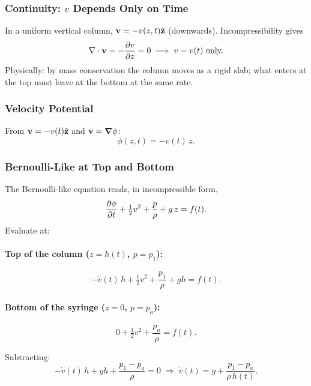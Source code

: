 \documentclass[../main.tex]{subfiles}
\begin{document}
\subsubsection{Continuity: $v$ Depends Only on Time}

In a uniform vertical column, $\mathbf{v} = -v(z,t)\hat{\mathbf{z}}$ (downwards). Incompressibility gives
\begin{equation}
  \nabla \cdot\mathbf{v} = -\pdv{v}{z} = 0 \;\Longrightarrow\; v=v(t)\text{ only.}
  \label{eq:lec15_v_t}
\end{equation}
Physically: by mass conservation the column moves as a rigid slab; what enters at the top must leave at the bottom at the same rate.

\subsubsection{Velocity Potential}

From $\mathbf{v} = -v(t)\hat{\mathbf{z}}$ and $\mathbf{v}=\grad\phi$:
\begin{equation}
  \phi(z,t) = -v(t)\,z.
  \label{eq:lec15_phi_syringe}
\end{equation}

\subsubsection{Bernoulli-Like at Top and Bottom}

The Bernoulli-like equation reads, in incompressible form,
\begin{equation}
  \pdv{\phi}{t} + \tfrac{1}{2}v^2 + \frac{p}{\rho} + g\,z = f(t).
  \label{eq:lec15_bern_syringe}
\end{equation}
Evaluate at:

\paragraph{Top of the column ($z=h(t)$, $p=p_1$):}
\[
  -\dot v(t)\,h + \tfrac{1}{2}v^2 + \frac{p_1}{\rho} + g h = f(t).
\]

\paragraph{Bottom of the syringe ($z=0$, $p=p_a$):}
\[
  0 + \tfrac{1}{2}v^2 + \frac{p_a}{\rho} = f(t).
\]

Subtracting:
\begin{equation}
  -\dot v(t)\,h + g h + \frac{p_1 - p_a}{\rho} = 0
  \;\Longrightarrow\;
  \dot v(t) = g + \frac{p_1 - p_a}{\rho\,h(t)}.
  \label{eq:lec15_vdot}
\end{equation}
\end{document}

